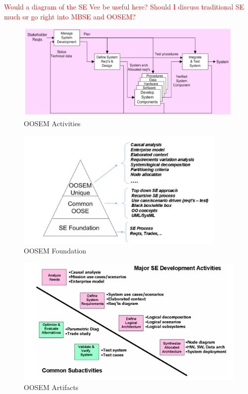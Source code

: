 \textcolor{red}{Would a diagram of the SE Vee be useful here? Should I discuss traditional SE much or go right into MBSE and OOSEM?}

\begin{figure}[!h]
    \centering
    \includegraphics[width=6in]{Thesis/Literature_Review/Lit Review Figures/OOSEM activities.png}
    \caption{OOSEM Activities}
    \label{fig:OOSEM Activities}
\end{figure}

\begin{figure}[!h]
    \centering
    \includegraphics[width=4in]{Thesis/Literature_Review/Lit Review Figures/OOSEM Foundation.png}
    \caption{OOSEM Foundation}
    \label{fig:OOSEM Foundation}
\end{figure}

\begin{figure}[!h]
    \centering
    \includegraphics[width=6in]{Thesis/Literature_Review/Lit Review Figures/OOSEM artifacts.png}
    \caption{OOSEM Artifacts}
    \label{fig:OOSEM Artifacts}
\end{figure}

